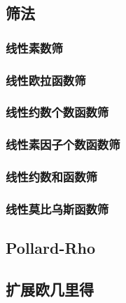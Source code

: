 \documentclass{article}
\begin{document}
\subsection{筛法}
\subsubsection{线性素数筛}

\subsubsection{线性欧拉函数筛}

\subsubsection{线性约数个数函数筛}

\subsubsection{线性素因子个数函数筛}

\subsubsection{线性约数和函数筛}

\subsubsection{线性莫比乌斯函数筛}

\subsection{Pollard-Rho}

\subsection{扩展欧几里得}
\end{document}
